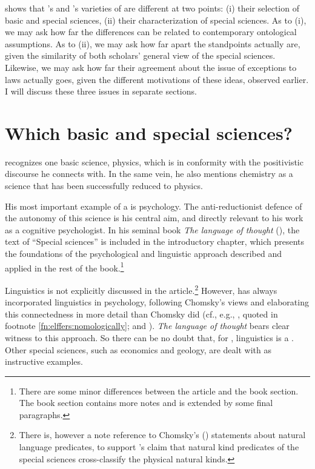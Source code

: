 \documentclass[output=paper]{langscibook}
\begin{document}
 shows that {\Sapir}'s and {\Fodor}'s varieties of  are different at two points: (i) their selection of basic and special sciences, (ii) their characterization of special sciences. As to (i), we may ask how far the differences can be related to contemporary ontological assumptions. As to (ii), we may ask how far apart the standpoints actually are, given the similarity of both scholars' general view of the special sciences. Likewise, we may ask how far their agreement about the issue of exceptions to laws actually goes, given the different motivations of these ideas, observed earlier. I will discuss these three issues in separate sections.

\section{Which basic and special sciences?}
\label{sec:elffers:basicspecial}

{\Fodor} recognizes one basic science, physics, which is in conformity with the positivistic discourse he connects with. In the same vein, he also mentions chemistry as a science that has been successfully reduced to physics.

His most important example of a  is psychology. The anti-reduc\-tionist defence of the autonomy of this science is his central aim, and directly relevant to his work as a cognitive psychologist. In his seminal book \emph{The language of thought} (\citeyear{Fodor1975}), the text of ``Special sciences'' is included in the introductory chapter, which presents the foundations of the psychological and linguistic approach described and applied in the rest of the book.\footnote{There are some minor differences between the article and the book section. The book section contains more notes and is extended by some final paragraphs.}

Linguistics is not explicitly discussed in the \citeyear{Fodor1974} article.\footnote{There is, however a note reference to Chomsky's (\citeyear{Chomsky1965}) statements about natural language predicates, to support {\Fodor}'s claim that natural kind predicates of the special sciences cross-classify the physical natural kinds.} However, {\Fodor} has always incorporated linguistics in psychology, following Chomsky's views and elaborating this connectedness in more detail than Chomsky did (cf., e.g., \citealt[149]{Fodor1985}, quoted in footnote \ref{fn:elffers:nomologically}; and \citealt[278]{LoewerRey1991}). \emph{The language of thought} bears clear witness to this approach. So there can be no doubt that, for {\Fodor}, linguistics is a . Other special sciences, such as economics and geology, are dealt with as instructive examples.
\end{document}

